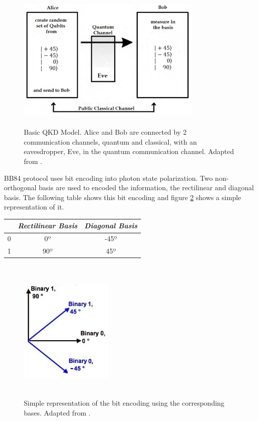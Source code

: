 \begin{figure}[H]
	\centering
	\includegraphics[width=0.8\textwidth,height=7cm]{./sdf/bb84_with_discrete_variables/figures/QKD_Model.png}
	\caption{Basic QKD Model. Alice and Bob are connected by 2 communication channels, quantum and classical, with an eavesdropper, Eve, in the quantum communication channel. Adapted from \cite{iqo}.}\label{fig:qkd model}
\end{figure}


BB84 protocol uses bit encoding into photon state polarization. Two non-orthogonal basis are used to encoded the information, the rectilinear and diagonal basis. The following table shows this bit encoding and figure \ref{fig:basis} shows a simple representation of it.

\begin{table}[H]
	\centering
	\begin{tabular}{c|c|c}
		 &  \textbf{\textit{Rectilinear Basis}} & \textbf{\textit{Diagonal Basis}}\\ \hline
		0 &  0$º$ & -45$º$ \\
		1 & 90$º$ & 45$º$\\
	\end{tabular}
\end{table}

\begin{figure}[H]
	\centering
	\includegraphics[width=0.4\textwidth,height=7cm]{./sdf/bb84_with_discrete_variables/figures/basis.png}
	\caption{Simple representation of the bit encoding using the corresponding bases. Adapted from \cite{SURV}.}\label{fig:basis}
\end{figure}


